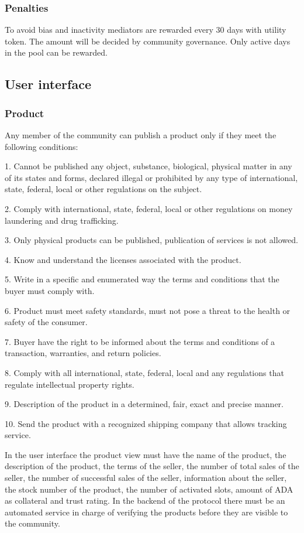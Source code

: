 \documentclass[12pt]{article}
\begin{document}
\subsubsection { Penalties } 

To avoid bias and inactivity mediators are rewarded every 30 days with utility token. The amount will be decided by community governance. Only active days in the pool can be rewarded.

\subsection{ User interface }

\subsubsection { Product } 

Any member of the community can publish a product only if they meet the following conditions:

1. Cannot be published any object, substance, biological, physical matter in any of its states and forms, declared illegal or prohibited by any type of international, state, federal, local or other regulations on the subject.

2. Comply with international, state, federal, local or other regulations on money laundering and drug trafficking.

3. Only physical products can be published, publication of services is not allowed.

4. Know and understand the licenses associated with the product.

5. Write in a specific and enumerated way the terms and conditions that the buyer must comply with.

6. Product must meet safety standards, must not pose a threat to the health or safety of the consumer.

7. Buyer have the right to be informed about the terms and conditions of a transaction, warranties, and return policies.

8. Comply with all international, state, federal, local and any regulations that regulate intellectual property rights.

9. Description of the product in a determined, fair, exact and precise manner.

10. Send the product with a recognized shipping company that allows tracking service.

In the user interface the product view must have the name of the product, the description of the product, the terms of the seller, the number of total sales of the seller, the number of successful sales of the seller, information about the seller, the stock number of the product, the number of activated slots, amount of ADA as collateral and trust rating. In the backend of the protocol there must be an automated service in charge of verifying the products before they are visible to the community.
\end{document}

